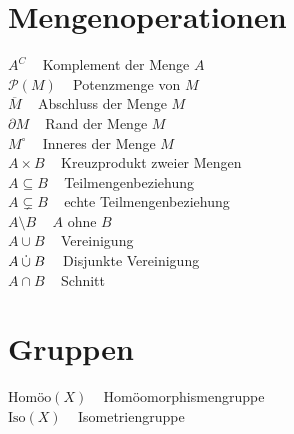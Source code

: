 \begin{minipage}[t]{0.45\textwidth}
\section*{Mengenoperationen}
$A^C\;\;\;$ Komplement der Menge $A$\\
$\mathcal{P}(M)\;\;\;$ Potenzmenge von $M$\\
$\overline{M}\;\;\;$ Abschluss der Menge $M$\\
$\partial M\;\;\;$ Rand der Menge $M$\\
$M^\circ\;\;\;$ Inneres der Menge $M$\\
$A \times B\;\;\;$ Kreuzprodukt zweier Mengen\\
$A \subseteq B\;\;\;$ Teilmengenbeziehung\\
$A \subsetneq B\;\;\;$ echte Teilmengenbeziehung\\
$A \setminus B\;\;\;$ $A$ ohne $B$\\
$A \cup B\;\;\;$ Vereinigung\\
$A \mathbin{\dot{\cup}} B\;\;\;$ Disjunkte Vereinigung\\
$A \cap B\;\;\;$ Schnitt\\

\section*{Gruppen}
$\text{Homöo}(X)\;\;\;$ Homöomorphismengruppe\\
$\text{Iso}(X)\;\;\;$ Isometriengruppe\\
\end{minipage}





